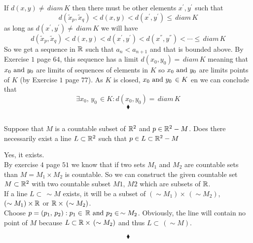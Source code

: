 If $d(x,y)\neq \, diam \, K$ then there must be other elements $x^{'},y^{'}$ such that 
$$d(\tilde{x}_p,\tilde{x}_q)<d(x,y)<d(x^{'},y^{'})\leq \, diam \, K$$
as long as $d(x^{'},y^{'})\neq \, diam \, K$ we will have 
$$d(\tilde{x}_p,\tilde{x}_q)<d(x,y)<d(x^{'},y^{'})<d(x^{''},y^{''})<\cdots \leq \, diam \, K$$
So we get a sequence in $\mathbb{R}$ such that $a_n<a_{n+1}$ and that is  bounded above. By Exercise $1$ page $64$, this sequence has a limit $d(x_0,y_0)= \, diam \, K$ meaning that $x_0\text{ and }  y_0$  are limits of sequences of elements in $K$ so $x_0\text{ and }  y_0$ are limits points of $K$ (by Exercise $1$ page $77$). As $K$ is closed, $x_0\text{ and } y_0\, \in K$ en we can conclude that $$\exists x_0,\, y_0\,\in K: d(x_0, y_0)= \, diam\, K$$
$$\blacklozenge$$
\renewcommand{\thesubsection}{\thesection.\RomanNumeralCaps{5}}
\subsection{}

\begin{tcolorbox}
Suppose that $M$ is a countable subset of $\mathbb{R}^2$ and $p\in \mathbb{R}^2-M$. Does there necessarily exist a line $L \subset\mathbb{R}^2$ such that $p\in L\subset \mathbb{R}^2-M$
\end{tcolorbox}
Yes, it exists.\\
By exercise $4$ page $51$ we know that if two sets $M_1$ and $M_2$ are countable sets than $M=M_1\times M_2$ is countable. So we can construct the given countable set $M\subset \mathbb{R}^2$ with two countable subset $M1,\, M2$ which are subsets of $\mathbb{R}$. \\
If a line $L\subset\,  \sim M$ exists, it will be a subset of $(\sim M_1)\times\,  (\sim M_2)$, $(\sim M_1)\times \mathbb{R}$ or $\mathbb{R}\times \, (\sim M_2)$.\\
Choose $p=(p_1,\, p_2): p_1\in \,\mathbb{R}\text{ and } p_2 \in \,\sim M_2$. Obviously, the line will contain no point of $M$ because $L\subset \mathbb{R}\times \,( \sim M_2)$ and thus $L\subset\, (\sim M)$.


$$\blacklozenge$$

\renewcommand{\thesubsection}{\thesection.\RomanNumeralCaps{6}}
\subsection{}

